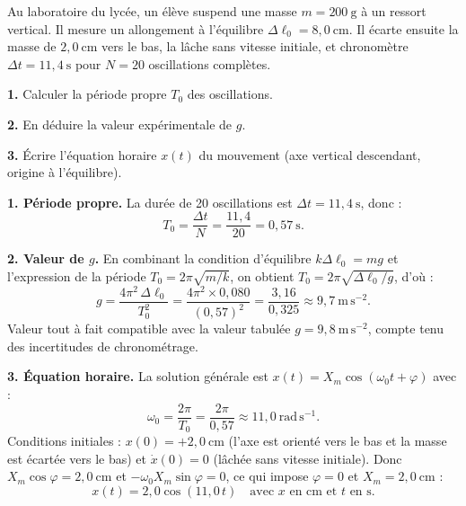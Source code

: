 \documentclass[11pt]{article}
\begin{document}
\begin{exoresolu}
Au laboratoire du lycée, un élève suspend une masse $m = 200~\mathrm{g}$ à un ressort vertical. Il mesure un allongement à l'équilibre $\Delta\ell_0 = 8{,}0~\mathrm{cm}$. Il écarte ensuite la masse de $2{,}0~\mathrm{cm}$ vers le bas, la lâche sans vitesse initiale, et chronomètre $\Delta t = 11{,}4~\mathrm{s}$ pour $N = 20$ oscillations complètes.

\textbf{1.} Calculer la période propre $T_0$ des oscillations.

\textbf{2.} En déduire la valeur expérimentale de $g$.

\textbf{3.} Écrire l'équation horaire $x(t)$ du mouvement (axe vertical descendant, origine à l'équilibre).

\tcblower

\textbf{1. Période propre.} La durée de 20 oscillations est $\Delta t = 11{,}4~\mathrm{s}$, donc :
\[ T_0 = \frac{\Delta t}{N} = \frac{11{,}4}{20} = 0{,}57~\mathrm{s}. \]

\textbf{2. Valeur de $g$.} En combinant la condition d'équilibre $k\Delta\ell_0 = mg$ et l'expression de la période $T_0 = 2\pi\sqrt{m/k}$, on obtient $T_0 = 2\pi\sqrt{\Delta\ell_0/g}$, d'où :
\[ g = \frac{4\pi^2\,\Delta\ell_0}{T_0^2} = \frac{4\pi^2 \times 0{,}080}{(0{,}57)^2} = \frac{3{,}16}{0{,}325} \approx 9{,}7~\mathrm{m\,s^{-2}}. \]
Valeur tout à fait compatible avec la valeur tabulée $g = 9{,}8~\mathrm{m\,s^{-2}}$, compte tenu des incertitudes de chronométrage.

\textbf{3. Équation horaire.} La solution générale est $x(t) = X_m\cos(\omega_0 t + \varphi)$ avec :
\[ \omega_0 = \frac{2\pi}{T_0} = \frac{2\pi}{0{,}57} \approx 11{,}0~\mathrm{rad\,s^{-1}}. \]
Conditions initiales : $x(0) = +2{,}0~\mathrm{cm}$ (l'axe est orienté vers le bas et la masse est écartée vers le bas) et $\dot{x}(0) = 0$ (lâchée sans vitesse initiale). Donc $X_m\cos\varphi = 2{,}0~\mathrm{cm}$ et $-\omega_0 X_m\sin\varphi = 0$, ce qui impose $\varphi = 0$ et $X_m = 2{,}0~\mathrm{cm}$ :
\[ x(t) = 2{,}0\cos(11{,}0\,t) \quad \text{avec } x \text{ en cm et } t \text{ en s}. \]
\end{exoresolu}
\end{document}
